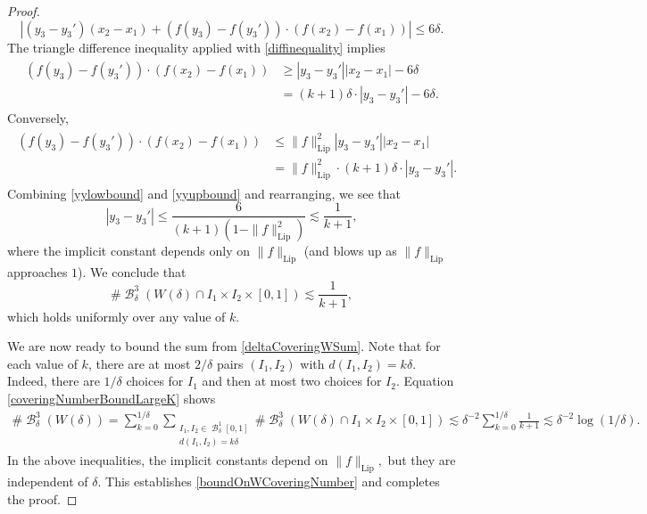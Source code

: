 \documentclass[dvipsnames,letterpaper,12pt]{article}
\numberwithin{equation}{section}
\theoremstyle{plain}
\theoremstyle{remark}
\DeclareMathOperator{\B}{\mathcal{B}}
\begin{document}
\begin{proof}
	\begin{equation} \label{diffinequality}
		\left| \left( y_3 - y_3' \right) (x_2 - x_1) + (f(y_3) - f(y_3')) \cdot (f(x_2) - f(x_1)) \right| \leq 6\delta.
	\end{equation}
	The triangle difference inequality applied with \eqref{diffinequality} implies
	\begin{align} \label{yylowbound}
	\begin{split}
		(f(y_3) - f(y_3')) \cdot (f(x_2) - f(x_1)) &\geq |y_3 - y_3'||x_2-x_1| - 6\delta\\ &= (k+1)\delta \cdot |y_3 - y_3'| - 6 \delta.
	\end{split}
	\end{align}
	Conversely,
	\begin{align} \label{yyupbound}
	\begin{split}
		(f(y_3) - f(y_3')) \cdot (f(x_2) - f(x_1)) &\leq \| f \|_{\text{Lip}}^2 |y_3 - y_3'| |x_2 - x_1| \\ &=  \| f \|_{\text{Lip}}^2 \cdot (k+1) \delta \cdot |y_3 - y_3'|.
	\end{split}
	\end{align}
Combining \eqref{yylowbound} and \eqref{yyupbound} and rearranging, we see that
	\begin{equation}\label{y3minusY3Prime} |y_3 - y_3'| \leq \frac{6}{(k+1)(1 - \| f \|_{\text{Lip}}^2)}  \lesssim\frac{1}{k+1},
	 \end{equation} 
	where the implicit constant depends only on $\| f \|_{\text{Lip}}$ (and blows up as $\| f \|_{\text{Lip}}$ approaches $1$).  We conclude that
	\begin{equation}\label{coveringNumberBoundLargeK} \# \B^3_\delta(W(\delta) \cap I_1 \times I_2 \times [0,1]) \lesssim \frac{1}{k+1},\end{equation} 
which holds uniformly over any value of $k$.

We are now ready to bound the sum from \eqref{deltaCoveringWSum}. Note that for each value of $k$, there are at most $2/\delta$ pairs $(I_1,I_2)$ with $d(I_1,I_2) = k \delta$. Indeed, there are $1/\delta$ choices for $I_1$ and then at most two choices for $I_2$. Equation  \eqref{coveringNumberBoundLargeK} shows 
	\begin{align*}
		\# \B^3_\delta(W(\delta)) = \sum_{k = 0}^{1/\delta} \sum_{\substack{I_1, I_2 \in \B^1_\delta[0,1]\\d(I_1,I_2) = k\delta}} \# \B^3_\delta(W(\delta) \cap I_1 \times I_2 \times [0,1])
		\lesssim \delta^{-2} \sum_{k = 0}^{1/\delta} \frac{1}{k+1}
		\lesssim \delta^{-2}\log(1/\delta).
	\end{align*}
In the above inequalities, the implicit constants depend on $\| f \|_{\text{Lip}},$ but they are independent of $\delta$. This establishes \eqref{boundOnWCoveringNumber} and completes the proof.
\end{proof}



\end{document}
